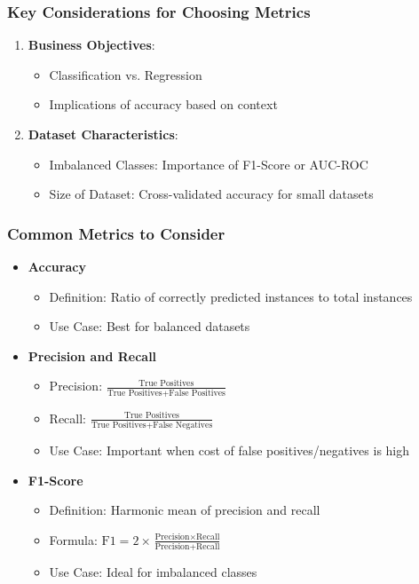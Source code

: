 \documentclass[aspectratio=169]{beamer}
\begin{document}
\begin{frame}[fragile]
    \frametitle{Key Considerations for Choosing Metrics}
    \begin{enumerate}
        \item \textbf{Business Objectives}:
        \begin{itemize}
            \item Classification vs. Regression
            \item Implications of accuracy based on context
        \end{itemize}
        
        \item \textbf{Dataset Characteristics}:
        \begin{itemize}
            \item Imbalanced Classes: Importance of F1-Score or AUC-ROC
            \item Size of Dataset: Cross-validated accuracy for small datasets
        \end{itemize}
    \end{enumerate}
\end{frame}

\begin{frame}[fragile]
    \frametitle{Common Metrics to Consider}
    \begin{itemize}
        \item \textbf{Accuracy}
        \begin{itemize}
            \item Definition: Ratio of correctly predicted instances to total instances
            \item Use Case: Best for balanced datasets
        \end{itemize}
        
        \item \textbf{Precision and Recall}
        \begin{itemize}
            \item Precision: $\frac{\text{True Positives}}{\text{True Positives} + \text{False Positives}}$
            \item Recall: $\frac{\text{True Positives}}{\text{True Positives} + \text{False Negatives}}$
            \item Use Case: Important when cost of false positives/negatives is high
        \end{itemize}
        
        \item \textbf{F1-Score}
        \begin{itemize}
            \item Definition: Harmonic mean of precision and recall
            \item Formula: $\text{F1} = 2 \times \frac{\text{Precision} \times \text{Recall}}{\text{Precision} + \text{Recall}}$
            \item Use Case: Ideal for imbalanced classes
        \end{itemize}
    \end{itemize}
\end{frame}
\end{document}
